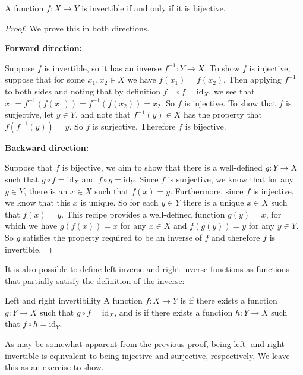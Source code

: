 \begin{thrm}{}{}
A function $f:X \to Y$ is invertible if and only if it is bijective.
\end{thrm}
\begin{proof}
We prove this in both directions.

\textbf{Forward direction:}

Suppose $f$ is invertible, so it has an inverse $f^{-1}: Y \to X$. To show $f$ is injective, suppose that for some $x_1, x_2 \in X$ we have $f(x_1) = f(x_2)$. Then applying $f^{-1}$ to both sides and noting that by definition $f^{-1} \circ f = \mathrm{id}_X$, we see that $x_1 = f^{-1}(f(x_1)) = f^{-1}(f(x_2)) = x_2$. So $f$ is injective. To show that $f$ is surjective, let $y \in Y$, and note that $f^{-1}(y) \in X$ has the property that $f(f^{-1}(y)) = y$. So $f$ is surjective. Therefore $f$ is bijective.

\textbf{Backward direction:}

Suppose that $f$ is bijective, we aim to show that there is a well-defined $g:Y \to X$ such that $g \circ f = \mathrm{id}_X$ and $f \circ g = \mathrm{id}_Y$. Since $f$ is surjective, we know that for any $y \in Y$, there is an $x \in X$ such that $f(x) = y$. Furthermore, since $f$ is injective, we know that this $x$ is unique. So for each $y \in Y$ there is a unique $x \in X$ such that $f(x) = y$. This recipe provides a well-defined function $g(y) = x$, for which we have $g(f(x)) = x$ for any $x \in X$ and $f(g(y)) = y$ for any $y \in Y$. So $g$ satisfies the property required to be an inverse of $f$ and therefore $f$ is invertible.
\end{proof}

It is also possible to define left-inverse and right-inverse functions as functions that partially satisfy the definition of the inverse:

\begin{defn}{Left and right invertibility}{}
A function $f:X \to Y$ is  if there exists a function $g:Y \to X$ such that $g \circ f = \mathrm{id}_X$, and is  if there exists a function $h: Y \to X$ such that $f \circ h = \mathrm{id}_Y$.
\end{defn}

As may be somewhat apparent from the previous proof, being left- and right-invertible is equivalent to being injective and surjective, respectively. We leave this as an exercise to show.
\pagebreak

